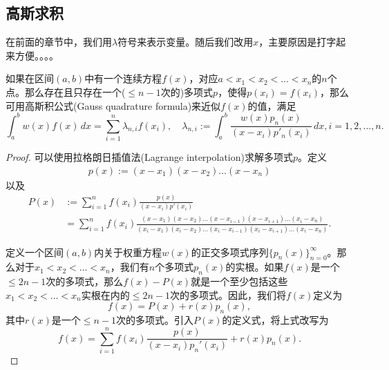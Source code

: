 \begin{subappendices}
\subsection{高斯求积}
\label{sec:poly-gauss-quadrature}
在前面的章节中，我们用$\lambda$符号来表示变量。随后我们改用$x$，主要原因是打字起来方便。。。。

\begin{theorem}[高斯求积公式]
  \label{theorem:poly-gauss-quadrature-def}
  如果在区间$(a,b)$中有一个连续方程$f(x)$，对应$a<x_1<x_2< \ldots < x_n$的$n$个点。那么存在且只存在一个($\le n-1$次的)多项式$p$，使得$p(x_i) = f(x_i)$，那么可用高斯积公式(Gauss quadrature formula)来近似$f(x)$的值，满足
  \begin{equation}
    \label{eq:poly-gauss-quadrature-def}
    \int_a^b w(x) f(x) \, dx = \sum_{i=1}^n \lambda_{n,i} f(x_i), \quad \lambda_{n,i}:= \int_a^b \frac{w(x) p_n(x)}{\left( x-x_i \right) p'_n(x_i)} \, dx, i=1,2,\ldots,n.
  \end{equation}
\end{theorem}
\begin{proof}
可以使用拉格朗日插值法(Lagrange interpolation)求解多项式$p$。定义
\begin{align*}
  p(x) := (x-x_1) (x-x_2) \ldots (x-x_n)
\end{align*}
以及
\begin{equation*}
  \begin{split}
      P(x) &:= \sum_{i=1}^{n} f(x_i) \frac{p(x)}{(x-x_i) p'(x_i)} \\
      &= \sum_{i=1}^{n} f(x_i) \frac{(x-x_1) (x-x_2) \ldots (x-x_{i-1}) (x-x_{i+1}) \ldots (x_i-x_{n})}{(x_i-x_1) (x_i-x_2) \ldots (x_i-x_{i-1}) (x_i-x_{i+1}) \ldots (x_i-x_{n})}.
  \end{split}
\end{equation*}

定义一个区间$(a,b)$内关于权重方程$w(x)$的正交多项式序列$\{ p_n(x) \}_{n=0}^{\infty}$。那么对于$x_1 < x_2 < \ldots < x_n$，我们有$n$个多项式$p_n(x)$的实根。如果$f(x)$是一个$\le 2n-1$次的多项式，那么$f(x) - P(x)$就是一个至少包括这些$x_1 < x_2 < \ldots < x_n$实根在内的$\le 2n-1$次的多项式。因此，我们将$f(x)$定义为
\begin{equation*}
  f(x) = P(x) + r(x) p_n(x),
\end{equation*}
其中$r(x)$是一个$\le n-1$次的多项式。引入$P(x)$的定义式，将上式改写为
\begin{equation*}
  f(x) = \sum_{i=1}^{n} f(x_i) \frac{p(x)}{(x-x_i) p_n'(x_i)} + r(x) p_n(x).
\end{equation*}


\end{proof}
\end{subappendices}
